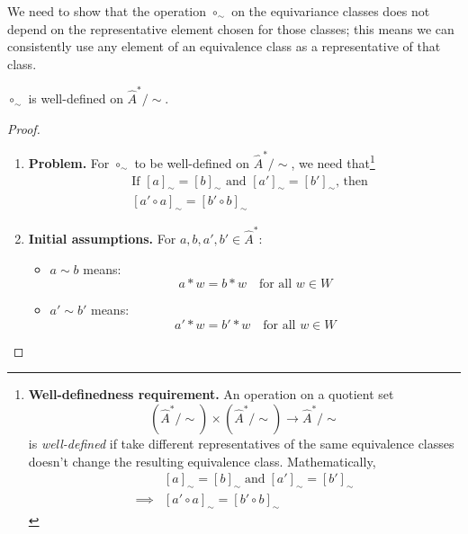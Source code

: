 We need to show that the operation $\circ_{\sim}$ on the equivariance classes does not depend on the representative element chosen for those classes; this means we can consistently use any element of an equivalence class as a representative of that class.

\begin{proposition}\label{prp:circ_sim_well_defined}
	$\circ_{\sim}$ is well-defined on $\hat{A}^{\ast}/\sim$.
\end{proposition}
\begin{proof}
\begin{enumerate}[(1)]
    \item \textbf{Problem.}
    For $\circ_{\sim}$ to be well-defined on $\hat{A}^{*}/\sim$, we need that\footnote{
    \textbf{Well-definedness requirement.}
    An operation on a quotient set
    \begin{equation}
        (\hat{A}^{*}/\sim) \times (\hat{A}^{*}/\sim) \to \hat{A}^{*}/\sim
    \end{equation}
    is \emph{well-defined} if take different representatives of the same equivalence classes doesn't change the resulting equivalence class.
    Mathematically,
    \begin{equation}
    \begin{aligned}
        & [a]_{\sim} = [b]_{\sim} \; \text{and} \; [a']_{\sim} = [b']_{\sim} \\
        \implies & [a' \circ a]_{\sim} = [b' \circ b]_{\sim}
    \end{aligned}
    \end{equation}
    }
    \begin{equation}
    \begin{aligned}
        & \text{If $[a]_{\sim} = [b]_{\sim}$ and $[a']_{\sim} = [b']_{\sim}$, then} \\
        & [a' \circ a]_{\sim} = [b' \circ b]_{\sim}
    \end{aligned}
    \end{equation}

    \item \textbf{Initial assumptions.}
          For $a, b, a', b' \in \hat{A}^{\ast}$:
          \begin{itemize}
              \item $a \sim b$ means:
                    \begin{equation}
                        a \ast w = b \ast w \quad \text{for all } w\in W
                    \end{equation}
              \item $a' \sim b'$ means:
                    \begin{equation}
                        a' \ast w = b' \ast w \quad \text{for all } w\in W
                    \end{equation}
          \end{itemize}


\end{enumerate}
\end{proof}

